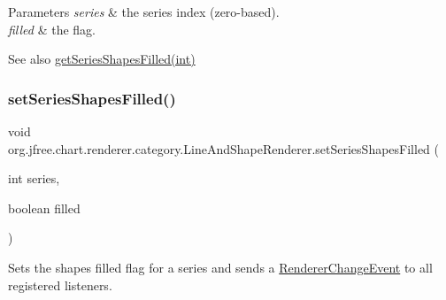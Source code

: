 \begin{DoxyParams}{Parameters}
{\em series} & the series index (zero-\/based). \\
\hline
{\em filled} & the flag.\\
\hline
\end{DoxyParams}
\begin{DoxySeeAlso}{See also}
\mbox{\hyperlink{classorg_1_1jfree_1_1chart_1_1renderer_1_1category_1_1_line_and_shape_renderer_aac2b05949484fcfc43a3ab5201422e55}{get\+Series\+Shapes\+Filled(int)}} 
\end{DoxySeeAlso}
\mbox{\label{classorg_1_1jfree_1_1chart_1_1renderer_1_1category_1_1_line_and_shape_renderer_a2c692850145976ff52413839710d6a8c}} 
\subsubsection{\texorpdfstring{set\+Series\+Shapes\+Filled()}{setSeriesShapesFilled()}\hspace{0.1cm}{\footnotesize\ttfamily [2/2]}}
{\footnotesize\ttfamily void org.\+jfree.\+chart.\+renderer.\+category.\+Line\+And\+Shape\+Renderer.\+set\+Series\+Shapes\+Filled (\begin{DoxyParamCaption}\item[{int}]{series,  }\item[{boolean}]{filled }\end{DoxyParamCaption})}

Sets the \textquotesingle{}shapes filled\textquotesingle{} flag for a series and sends a \mbox{\hyperlink{}{Renderer\+Change\+Event}} to all registered listeners.


